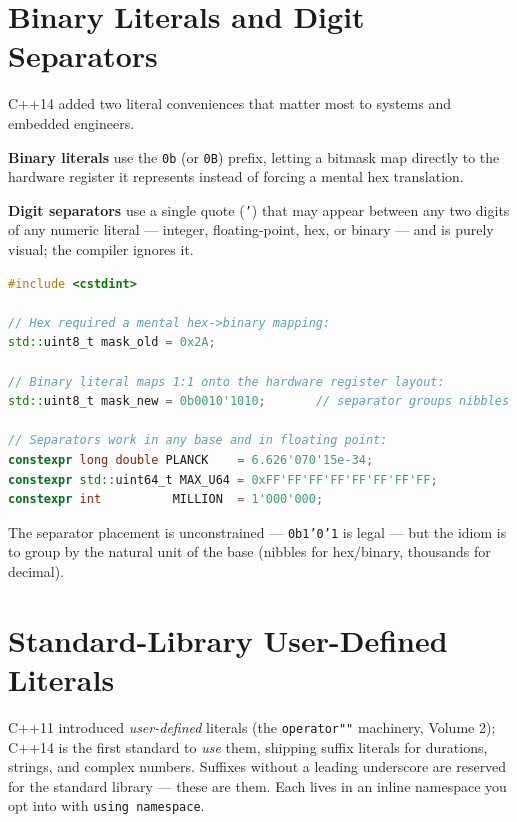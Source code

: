 \section{Binary Literals and Digit Separators}
\label{sec:c14-binary-literals}

C++14 added two literal conveniences that matter most to systems and embedded engineers.

\textbf{Binary literals} use the \texttt{0b} (or \texttt{0B}) prefix, letting a bitmask map directly to the hardware register it represents instead of forcing a mental hex translation.

\textbf{Digit separators} use a single quote (\texttt{'}) that may appear between any two digits of any numeric literal --- integer, floating-point, hex, or binary --- and is purely visual; the compiler ignores it.

\begin{lstlisting}[language=C++,caption={Binary literals and digit separators}]
#include <cstdint>

// Hex required a mental hex->binary mapping:
std::uint8_t mask_old = 0x2A;

// Binary literal maps 1:1 onto the hardware register layout:
std::uint8_t mask_new = 0b0010'1010;       // separator groups nibbles

// Separators work in any base and in floating point:
constexpr long double PLANCK    = 6.626'070'15e-34;
constexpr std::uint64_t MAX_U64 = 0xFF'FF'FF'FF'FF'FF'FF'FF;
constexpr int          MILLION  = 1'000'000;
\end{lstlisting}

The separator placement is unconstrained --- \texttt{0b1'0'1} is legal --- but the idiom is to group by the natural unit of the base (nibbles for hex/binary, thousands for decimal).

\section{Standard-Library User-Defined Literals}
\label{sec:c14-stdlib-udls}

C++11 introduced \emph{user-defined} literals (the \texttt{operator""} machinery, Volume 2); C++14 is the first standard to \emph{use} them, shipping suffix literals for durations, strings, and complex numbers. Suffixes without a leading underscore are reserved for the standard library --- these are them. Each lives in an inline namespace you opt into with \texttt{using namespace}.

